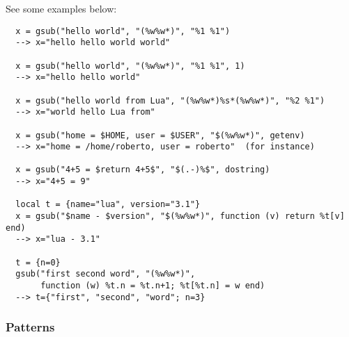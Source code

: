 \documentclass[11pt]{article}
\begin{document}
See some examples below:
\begin{verbatim}
  x = gsub("hello world", "(%w%w*)", "%1 %1")
  --> x="hello hello world world"

  x = gsub("hello world", "(%w%w*)", "%1 %1", 1)
  --> x="hello hello world"

  x = gsub("hello world from Lua", "(%w%w*)%s*(%w%w*)", "%2 %1")
  --> x="world hello Lua from"

  x = gsub("home = $HOME, user = $USER", "$(%w%w*)", getenv)
  --> x="home = /home/roberto, user = roberto"  (for instance)

  x = gsub("4+5 = $return 4+5$", "$(.-)%$", dostring)
  --> x="4+5 = 9"

  local t = {name="lua", version="3.1"}
  x = gsub("$name - $version", "$(%w%w*)", function (v) return %t[v] end)
  --> x="lua - 3.1"

  t = {n=0}
  gsub("first second word", "(%w%w*)",
       function (w) %t.n = %t.n+1; %t[%t.n] = w end)
  --> t={"first", "second", "word"; n=3}
\end{verbatim}


\subsubsection*{Patterns} \label{pm}
\end{document}

